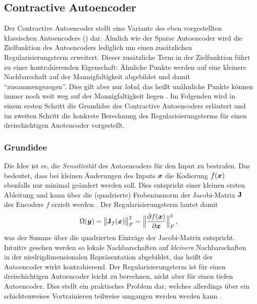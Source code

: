 \subsection{Contractive Autoencoder}
\label{ch:MethodenDerDimRed:ML:CAE}

Der Contractive Autoencoder \parencite{Rifai.2011} stellt eine Variante des eben vorgestellten klassischen Autoencoders
() dar. Ähnlich wie der Sparse Autoencoder wird die
Zielfunktion des Autoencoders lediglich um einen zusätzlichen Regularisierungsterm erweitert.
Dieser zusätzliche Term in der Zielfunktion führt zu einer kontrahierenden Eigenschaft: Ähnliche
Punkte werden auf eine kleinere Nachbarschaft auf der Mannigfaltigkeit abgebildet und damit
\enquote{zusammengezogen}. Dies gilt aber nur \textit{lokal}, das heißt unähnliche Punkte können
immer noch weit weg auf der Mannigfaltigkeit liegen \parencite[521]{Goodfellow.2016}. Im Folgenden wird in einem ersten Schritt die Grundidee des
Contractive Autoencoders erläutert und im zweiten Schritt die konkrete Berechnung des
Regularisierungsterms für einen dreischichtigen Auotencoder vorgestellt.

\subsubsection{Grundidee}
\label{ch:MethodenDerDimRed:CAE:Grundidee}
Die Idee ist
es, die \textit{Sensitivität} des Autoencoders für den Input zu bestrafen. Das bedeutet, dass bei
kleinen Änderungen des Inputs $\bm{x}$ die Kodierung $f(\bm{x})$ ebenfalls nur minimal geändert
werden soll. Dies entspricht einer kleinen ersten Ableitung und kann über die (quadrierte)
Frobeniusnorm der Jacobi-Matrix $\mathbf{J}$ des Encoders $f$ erzielt werden \parencites[2]{Rifai.2011}[521]{Goodfellow.2016}. Der Regularisierungsterm lautet damit
\begin{equation}
	\label{eq:CAE-Regularisierung}
	\Omega(\vect{y}) = \norm[\big]{\mat{J}_f(\vect{x})}_F^2 =  \norm[\Big]{ \frac{\partial f(\vect{x})}{\partial \vect{x}} }^2_F \, ,
\end{equation}
was der Summe über die quadrierten Einträge der Jacobi-Matrix entspricht. Intuitiv gesehen werden so lokale Nachbarschaften auf \textit{kleinere} Nachbarschaften in der niedrigdimensionalen Repräsentation abgebildet, das heißt der Autoencoder wirkt kontrahierend.
Der Regularisierungsterm ist für einen dreischichtigen Autoencoder leicht zu berechnen, nicht aber für einen tiefen Autoencoder. Dies stellt ein praktisches Problem dar, welches allerdings über ein schichtenweises Vortrainieren teilweise umgangen werden werden kann \parencite[vgl.][522]{Goodfellow.2016}.

